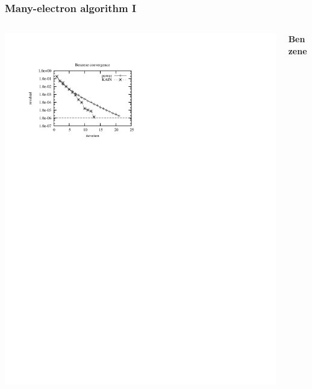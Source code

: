 \begin{frame}
    \frametitle{Many-electron algorithm I}
    \begin{columns}
    \begin{column}[b]{0.70\linewidth}
        \centering
        \includegraphics[scale=0.8, clip, viewport = 50 550 300 730]{figures/benzene_convergence.pdf}
    \end{column}
    \begin{column}[b]{0.30\linewidth}
        \centering
        \textbf{Benzene}

\end{column}
\end{columns}
\end{frame}
